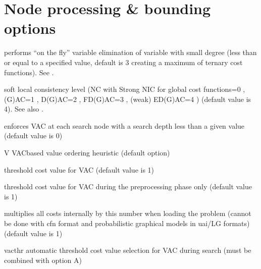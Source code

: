 \documentclass[letterpaper,10pt,openany,oneside,english]{sphinxmanual}
\begin{document}
\section{Node processing \& bounding options}
\label{\detokenize{userdoc:node-processing-bounding-options}}\begin{description}
\sphinxAtStartPar
performs “on the fly” variable elimination of variable with small
degree (less than or equal to a specified value, default is 3 creating
a maximum of ternary cost functions). See .

\sphinxAtStartPar
soft local consistency level (NC  with Strong NIC for global cost functions=0 , (G)AC=1  , D(G)AC=2 , FD(G)AC=3 , (weak) ED(G)AC=4  ) (default value is 4). See also  .

\sphinxAtStartPar
enforces VAC  at each search node with a search depth less than a given value (default value is 0)

\end{description}
\begin{optionlist}{3cm}
\item [\sphinxhyphen{}V]  
\sphinxAtStartPar
VAC\sphinxhyphen{}based value ordering heuristic (default option)
\end{optionlist}
\begin{description}
\sphinxAtStartPar
threshold cost value for VAC (default value is 1)

\sphinxAtStartPar
threshold cost value for VAC during the preprocessing phase only (default value is 1)

\sphinxAtStartPar
multiplies all costs internally by this number when loading the problem (cannot be done with cfn format and probabilistic graphical models in uai/LG formats) (default value is 1)

\end{description}
\begin{optionlist}{3cm}
\item [\sphinxhyphen{}vacthr]  
\sphinxAtStartPar
automatic threshold cost value selection for VAC during search (must be combined with option \sphinxhyphen{}A)
\end{optionlist}
\end{document}
